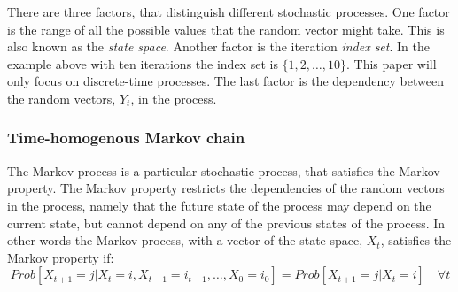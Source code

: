 \documentclass[preprint, 12pt]{elsarticle}
\begin{document}
There are three factors, that distinguish different stochastic processes. One factor is the range of all the possible values that the random vector might take. This is also known as the \emph{state space}. Another factor is the iteration \emph{index set}. In the example above with ten iterations the index set is $\{1, 2, \dots, 10\}$. This paper will only focus on discrete-time processes. The last factor is the dependency between the random vectors, $Y_t$, in the process.

\subsubsection{Time-homogenous Markov chain}

The Markov process is a particular stochastic process, that satisfies the Markov property. The Markov property restricts the dependencies of the random vectors in the process, namely that the future state of the process may depend on the current state, but cannot depend on any of the previous states of the process. In other words the Markov process, with a vector of the state space, $X_t$, satisfies the Markov property if:
\begin{equation}
Prob\left[ {X_{t+1} = j} \left| {X_t = i, X_{t-1} = i_{t-1}, \dots, X_0 = i_0} \right. \right] = Prob\left[ {X_{t+1} = j} \left| {X_t = i} \right. \right] \quad \forall t
\end{equation}
\end{document}
